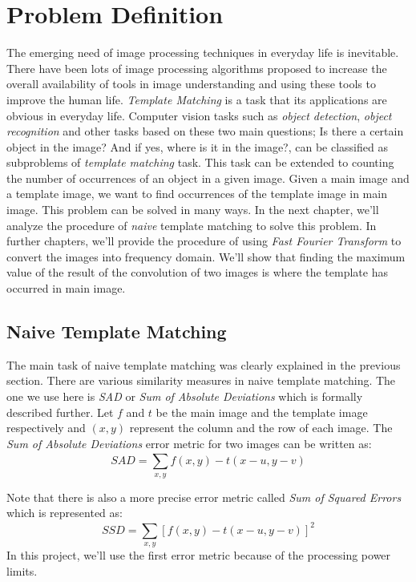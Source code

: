 \chapter{Problem Definition}

The emerging need of image processing techniques in everyday life is inevitable. There have been lots of image processing algorithms proposed to increase the overall availability of tools in image understanding and using these tools to improve the human life. \textit{Template Matching} is a task that its applications are obvious in everyday life. Computer vision tasks such as \textit{object detection}, \textit{object recognition} and other tasks based on these two main questions; Is there a certain object in the image? And if yes, where is it in the image?, can be classified as subproblems of \textit{template matching} task. This task can be extended to counting the number of occurrences of an object in a given image. Given a main image and a template image, we want to find occurrences of the template image in main image. This problem can be solved in many ways. In the next chapter, we'll analyze the procedure of \textit{naive} template matching to solve this problem. In further chapters, we'll provide the procedure of using \textit{Fast Fourier Transform} to convert the images into frequency domain. We'll show that finding the maximum value of the result of the convolution of two images is where the template has occurred in main image.

\section{Naive Template Matching}
The main task of naive template matching was clearly explained in the previous section. There are various similarity measures in naive template matching. The one we use here is \textit{SAD} or \textit{Sum of Absolute Deviations} which is formally described further. Let $f$ and $t$ be the main image and the template image respectively and $(x, y)$ represent the column and the row of each image. The \textit{Sum of Absolute Deviations} error metric for two images can be written as:
\begin{equation}
	SAD = \sum_{x, y}^{}f(x, y) - t(x - u, y - v)
\end{equation}

Note that there is also a more precise error metric called \textit{Sum of Squared Errors} which is represented as:
\begin{equation}
		SSD = \sum_{x, y}^{}[f(x, y) - t(x - u, y - v)]^2
\end{equation}
In this project, we'll use the first error metric because of the processing power limits.


